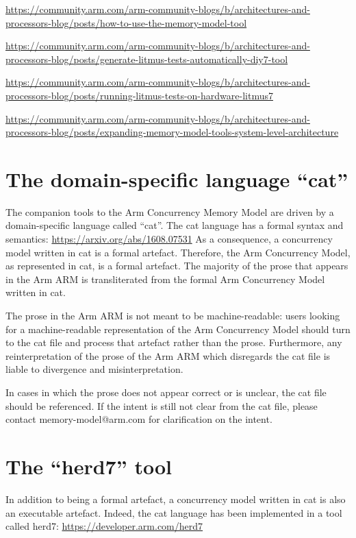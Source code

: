 \documentclass{book}
\begin{document}
\url{https://community.arm.com/arm-community-blogs/b/architectures-and-processors-blog/posts/how-to-use-the-memory-model-tool}

\url{https://community.arm.com/arm-community-blogs/b/architectures-and-processors-blog/posts/generate-litmus-tests-automatically-diy7-tool}

\url{https://community.arm.com/arm-community-blogs/b/architectures-and-processors-blog/posts/running-litmus-tests-on-hardware-litmus7}

\url{https://community.arm.com/arm-community-blogs/b/architectures-and-processors-blog/posts/expanding-memory-model-tools-system-level-architecture}

\section{The domain-specific language ``cat''}

The companion tools to the Arm Concurrency Memory Model are driven by a
domain-specific language called ``cat''. The cat language has a formal syntax
and semantics:  \url{https://arxiv.org/abs/1608.07531}
%
As a consequence, a concurrency model written in cat
is a formal artefact. Therefore, the Arm Concurrency
Model, as represented in cat, is a formal artefact.
The majority of the prose that appears in the Arm ARM
is transliterated from the formal Arm Concurrency
Model written in cat.  
 
The prose in the Arm ARM is not meant to be
machine-readable: users looking for a
machine-readable representation of the Arm
Concurrency Model should turn to the cat file and
process that artefact rather than the prose.
Furthermore, any reinterpretation of the prose of the
Arm ARM which disregards the cat file is liable to
divergence and misinterpretation.  

In cases in which the prose does not appear correct
or is unclear, the cat file should be referenced. If
the intent is still not clear from the cat file,
please contact memory-model@arm.com for clarification
on the intent. 

\section{The ``herd7'' tool}

In addition to being a formal artefact, a concurrency
model written in cat is also an executable artefact.
Indeed, the cat language has been implemented in a
tool called herd7: 
\url{https://developer.arm.com/herd7}
\end{document}
